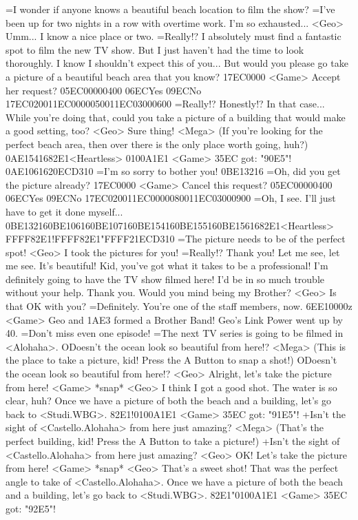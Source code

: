 =I wonder if anyone knows a beautiful beach location to film the show? 
=I've been up for two nights in a row with overtime work. I'm so exhausted... 
<Geo> Umm... 
I know a nice place or two. 
=Really!? 
I absolutely must find a fantastic spot to film the new TV show. 
But I just haven't had the time to look thoroughly. 
I know I shouldn't expect this of you... 
But would you please go take a picture of a beautiful beach area that you know? 
{17}{EC}{00}{00} 
<Game> Accept her request? {05}{EC}{00}{00}{04}{00}  {06}{EC}Yes   {09}{EC}No 
{17}{EC}{02}{00}{11}{EC}{00}{00}{05}{00}{11}{EC}{03}{00}{06}{00}
=Really!? Honestly!? In that case... 
While you're doing that, could you take a picture of 
a building that would make a good setting, too? 
<Geo> Sure thing! 
<Mega> (If you're looking for the  perfect beach area, then 
 over there is the only  place worth going, huh?) 
{0A}{E1}{54}{16}{82}{E1}<Heartless> {01}{00}{A1}{E1} 
<Game> {35}{EC} got: "{90}{E5}"! 
{0A}{E1}{06}{16}{20}{EC}{D3}{10}
=I'm so sorry to bother you! 
{0B}{E1}{32}{16}
=Oh, did you get the picture already? 
{17}{EC}{00}{00} 
<Game> Cancel this request? {05}{EC}{00}{00}{04}{00}  {06}{EC}Yes   {09}{EC}No 
{17}{EC}{02}{00}{11}{EC}{00}{00}{08}{00}{11}{EC}{03}{00}{09}{00}
=Oh, I see. I'll just have to get it done myself... 
{0B}{E1}{32}{16}{0B}{E1}{06}{16}{0B}{E1}{07}{16}{0B}{E1}{54}{16}{0B}{E1}{55}{16}{0B}{E1}{56}{16}{82}{E1}<Heartless> {FF}{FF}{82}{E1}!{FF}{FF}{82}{E1}"{FF}{FF}{21}{EC}{D3}{10}
=The picture needs to be of the perfect spot! 
<Geo> I took the pictures for you! 
=Really!? Thank you! 
Let me see, let me see. 
It's beautiful! Kid, you've got what it takes to be a professional! 
I'm definitely going to have the TV show filmed here! 
I'd be in so much trouble without your help. Thank you. 
Would you mind being my Brother? 
<Geo> Is that OK with you? 
=Definitely. You're one of the staff members, now. 
{6E}{E1}{00}{00}z 
<Game> Geo and {1A}{E3} formed a Brother Band! 
Geo's Link Power went up by 40. 
=Don't miss even one episode! 
=The next TV series is going to be filmed in <Alohaha>. 
ODoesn't the ocean look so beautiful from here!? 
<Mega> (This is the place to take  a picture, kid! Press the  A Button to snap a shot!) 
ODoesn't the ocean look so beautiful from here!? 
<Geo> Alright, let's take the picture from here! 
<Game> *snap* 
<Geo> I think I got a good shot. The water is so clear, huh? 
Once we have a picture of both the beach and a building, let's go back to <Studi.WBG>. 
{82}{E1}!{01}{00}{A1}{E1} 
<Game> {35}{EC} got: "{91}{E5}"! 
+Isn't the sight of <Castello.Alohaha> from here just amazing? 
<Mega> (That's the perfect building,  kid! Press the A Button  to take a picture!) 
+Isn't the sight of <Castello.Alohaha> from here just amazing? 
<Geo> OK! Let's take the picture from here! 
<Game> *snap* 
<Geo> That's a sweet shot! That was the perfect angle to take of <Castello.Alohaha>. 
Once we have a picture of both the beach and a building, let's go back to <Studi.WBG>. 
{82}{E1}"{01}{00}{A1}{E1} 
<Game> {35}{EC} got: "{92}{E5}"! 
